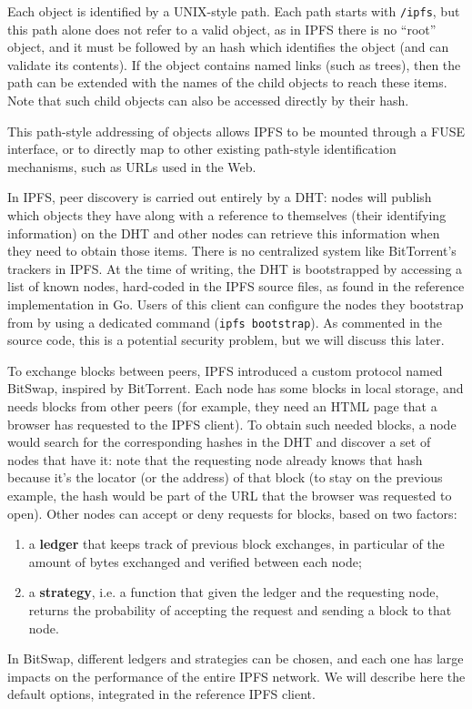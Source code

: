 \documentclass[mscthesis]{usiinfthesis}
\begin{document}
Each object is identified by a UNIX-style path. Each path starts with \texttt{/ipfs}, but this path alone does not refer to a valid object, as in IPFS there is no ``root'' object, and it must be followed by an hash which identifies the object (and can validate its contents). If the object contains named links (such as trees), then the path can be extended with the names of the child objects to reach these items. Note that such child objects can also be accessed directly by their hash.

This path-style addressing of objects allows IPFS to be mounted through a FUSE interface, or to directly map to other existing path-style identification mechanisms, such as URLs used in the Web.

In IPFS, peer discovery is carried out entirely by a DHT: nodes will publish which objects they have along with a reference to themselves (their identifying information) on the DHT and other nodes can retrieve this information when they need to obtain those items. There is no centralized system like BitTorrent's trackers in IPFS.
At the time of writing, the DHT is bootstrapped by accessing a list of known nodes, hard-coded in the IPFS source files, as found in the reference implementation in Go. Users of this client can configure the nodes they bootstrap from by using a dedicated command (\texttt{ipfs bootstrap}). As commented in the source code, this is a potential security problem, but we will discuss this later.

To exchange blocks between peers, IPFS introduced a custom protocol named BitSwap, inspired by BitTorrent. Each node has some blocks in local storage, and needs blocks from other peers (for example, they need an HTML page that a browser has requested to the IPFS client). To obtain such needed blocks, a node would search for the corresponding hashes in the DHT and discover a set of nodes that have it: note that the requesting node already knows that hash because it's the locator (or the address) of that block (to stay on the previous example, the hash would be part of the URL that the browser was requested to open). Other nodes can accept or deny requests for blocks, based on two factors:
\begin{enumerate}
	\item a \textbf{ledger} that keeps track of previous block exchanges, in particular of the amount of bytes exchanged and verified between each node;
	\item a \textbf{strategy}, i.e. a function that given the ledger and the requesting node, returns the probability of accepting the request and sending a block to that node.
\end{enumerate}
In BitSwap, different ledgers and strategies can be chosen, and each one has large impacts on the performance of the entire IPFS network. We will describe here the default options, integrated in the reference IPFS client.
\end{document}
